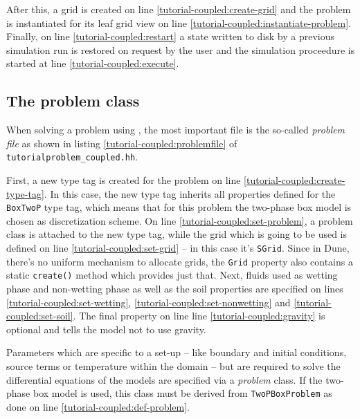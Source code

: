 After this, a grid is created on line
\ref{tutorial-coupled:create-grid} and the problem is instantiated for
its leaf grid view on line \ref{tutorial-coupled:instantiate-problem}.
Finally, on line \ref{tutorial-coupled:restart} a state written to
disk by a previous simulation run is restored on request by the user
and the simulation proceedure is started at line
\ref{tutorial-coupled:execute}.

\subsection{The problem class}

When solving a problem using \Dumux, the most important file is the
so-called \textit{problem file} as shown in listing
\ref{tutorial-coupled:problemfile} of
\texttt{tutorialproblem\_coupled.hh}.

\begin{lst}\label{tutorial-coupled:problemfile} \mbox{}

\end{lst}

First, a new type tag is created for the problem on line
\ref{tutorial-coupled:create-type-tag}.  In this case, the new type
tag inherits all properties defined for the \texttt{BoxTwoP} type tag,
which means that for this problem the two-phase box model is chosen as
discretization scheme. On line \ref{tutorial-coupled:set-problem}, a
problem class is attached to the new type tag, while the grid which
is going to be used is defined on line \ref{tutorial-coupled:set-grid} --
in this case it's \texttt{SGrid}.  Since in Dune, there's no uniform
mechanism to allocate grids, the \texttt{Grid} property also contains
a static \texttt{create()} method which provides just that. Next,
fluids used as wetting phase and non-wetting phase as well as the soil
properties are specified on lines \ref{tutorial-coupled:set-wetting},
\ref{tutorial-coupled:set-nonwetting} and
\ref{tutorial-coupled:set-soil}. The final property on line line
\ref{tutorial-coupled:gravity} is optional and tells the model not to
use gravity.

Parameters which are specific to a set-up -- like boundary and initial
conditions, source terms or temperature within the domain -- but are
required to solve the differential equations of the models are
specified via a \textit{problem} class. If the two-phase box model is
used, this class must be derived from \texttt{TwoPBoxProblem} as done
on line \ref{tutorial-coupled:def-problem}.

